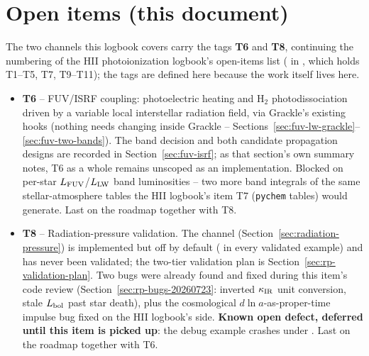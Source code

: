 \section{Open items (this document)}
\label{sec:isrf-open}

The two channels this logbook covers carry the tags \textbf{T6} and
\textbf{T8}, continuing the numbering of the HII photoionization
logbook's open-items list ( in
, which holds T1--T5, T7, T9--T11); the tags are
defined here because the work itself lives here.

\begin{itemize}
  \item[$\square$] \textbf{T6} -- FUV/ISRF coupling: photoelectric
    heating and H$_2$ photodissociation driven by a variable local
    interstellar radiation field, via Grackle's existing hooks (nothing
    needs changing inside Grackle --
    Sections~\ref{sec:fuv-lw-grackle}--\ref{sec:fuv-two-bands}). The
    band decision and both candidate propagation designs are recorded
    in Section~\ref{sec:fuv-isrf}; as that section's own summary notes,
    T6 as a whole remains unscoped as an implementation. Blocked on
    per-star $L_{\rm FUV}$/$L_{\rm LW}$ band luminosities -- two more
    band integrals of the same stellar-atmosphere tables the HII
    logbook's item T7 (\texttt{pychem} tables) would generate. Last on
    the roadmap together with T8.

  \item[$\square$] \textbf{T8} -- Radiation-pressure validation. The
    channel (Section~\ref{sec:radiation-pressure}) is implemented but
    off by default ( in every
    validated example) and has never been validated; the two-tier
    validation plan is Section~\ref{sec:rp-validation-plan}. Two bugs
    were already found and fixed during this item's code review
    (Section~\ref{sec:rp-bugs-20260723}: inverted $\kappa_{\rm IR}$
    unit conversion, stale $L_{\rm bol}$ past star death), plus the
    cosmological $d\ln a$-as-proper-time impulse bug fixed on the HII
    logbook's side. \textbf{Known open defect, deferred until this
    item is picked up}: the 
    debug example crashes under .
    Last on the roadmap together with T6.
\end{itemize}

